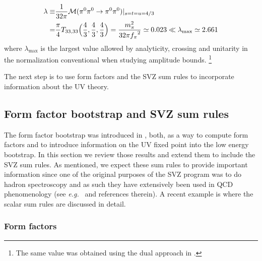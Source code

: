\documentclass[12pt,letterpaper]{article}
\newcommand{\eg}{{\it e.g.}}
\newcommand{\beq}{\begin{equation}}
\newcommand{\eeq}{\end{equation}}
\newcommand{\cM}{{\cal M}}
\begin{document}
\beq
\begin{aligned}
	\lambda\equiv&\frac{1}{32\pi}\cM(\pi^0\pi^0\to\pi^0\pi^0)|_{s=t=u=4/3}\\
	 =& \frac{\pi}{4} T_{33,33}\Big(\frac{4}{3},\frac{4}{3},\frac{4}{3}\Big)=\frac{m_\pi^2}{32\pi{f_\pi}^2}\simeq 0.023\ll \lambda_{\text{max}}\simeq 2.661
\end{aligned}
\eeq
 where $\lambda_{\text{max}}$ is the largest value allowed by analyticity, crossing and unitarity \cite{Paulos:2017fhb} in the normalization conventional when studying amplitude bounds. \footnote{The same value was obtained using the dual approach in \cite{He:2021eqn}.}

\smallskip

The next step is to use form factors and the SVZ sum rules to incorporate information about the UV theory. 

\subsection{Form factor bootstrap and SVZ sum rules}

   The form factor bootstrap was introduced in \cite{Karateev:2019ymz}, both, as a way to compute form factors and to introduce information on the UV fixed point into the low energy bootstrap. In this section we review those results and extend them to include the SVZ sum rules. As mentioned, we expect these sum rules to provide important information since one of the original purposes of the SVZ program was to do hadron spectroscopy and as such they have extensively been used in QCD phenomenology (see \eg\ \cite{donoghue_golowich_holstein_2014, Peskin:1995ev,  narison_2004} and references therein). A recent example is \cite{cherry2001qcd} where the scalar sum rules are discussed in detail.   
   
   
   \subsubsection{Form factors}
   
\end{document}
